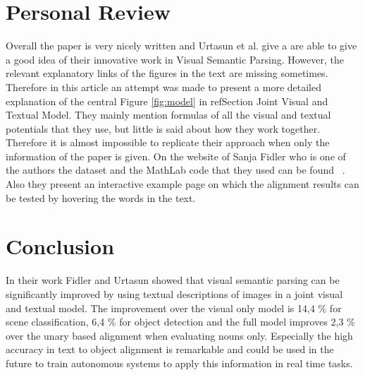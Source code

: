 \documentclass{utue} %
\begin{document}
\section{Personal Review}
Overall the paper is very nicely written and Urtasun et al. give a are able to give a good idea of their innovative work in Visual Semantic Parsing. However,  the relevant explanatory links of the figures in the text are missing sometimes. Therefore in this article an attempt was made to present a more detailed explanation of the central Figure \ref{fig:model} in ref{Section Joint Visual and Textual Model}. They mainly mention formulas of all the visual and textual potentials that they use, but little is said about how they work together. Therefore it is almost impossible to replicate their approach when only the information of the paper is given. On the website of Sanja Fidler who is one of the authors the dataset and the MathLab code that they used can be found ~\cite{fidler_online2014}. Also they present an interactive example page on which the alignment results can be tested by hovering the words in the text.

\section{Conclusion}
In their work Fidler and Urtasun showed that visual semantic parsing can be significantly improved by using textual descriptions of images in a joint visual and textual model. The improvement over the visual only model is 14,4 \% for scene classification, 6,4 \% for object detection and the full model improves 2,3 \% over the unary based alignment when evaluating nouns only. Especially the high accuracy in text to object alignment is remarkable and could be used in the future to train autonomous systems to apply this information in real time tasks.



\end{document}
